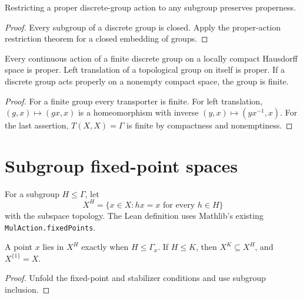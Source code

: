 \begin{proposition}\label{prop:proper-subgroup-restriction}
Restricting a proper discrete-group action to any subgroup preserves
properness.
\end{proposition}
\begin{proof}
\leanok
Every subgroup of a discrete group is closed. Apply the proper-action
restriction theorem for a closed embedding of groups.
\end{proof}

\begin{proposition}\label{prop:proper-action-examples}
Every continuous action of a finite discrete group on a locally compact
Hausdorff space is proper. Left translation of a topological group on
itself is proper. If a discrete group acts properly on a nonempty compact
space, the group is finite.
\end{proposition}
\begin{proof}
\leanok
For a finite group every transporter is finite. For left translation,
$(g,x)\mapsto(gx,x)$ is a homeomorphism with inverse
$(y,x)\mapsto(yx^{-1},x)$. For the last assertion,
$T(X,X)=\Gamma$ is finite by compactness and nonemptiness.
\end{proof}

\section{Subgroup fixed-point spaces}

\begin{definition}\label{def:subgroup-fixed-point-space}
\leanok
For a subgroup $H\leq\Gamma$, let
\[
 X^H=\{x\in X: hx=x\text{ for every }h\in H\}
\]
with the subspace topology. The Lean definition uses Mathlib's existing
\texttt{MulAction.fixedPoints}.
\end{definition}

\begin{proposition}\label{prop:fixed-point-subgroup-laws}
A point $x$ lies in $X^H$ exactly when $H\leq\Gamma_x$.
If $H\leq K$, then $X^K\subseteq X^H$, and $X^{\{1\}}=X$.
\end{proposition}
\begin{proof}
\leanok
Unfold the fixed-point and stabilizer conditions and use subgroup inclusion.
\end{proof}


